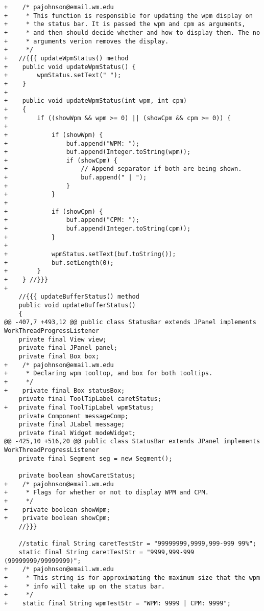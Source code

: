 \documentclass[12pt]{article}
\begin{document}
\begin{verbatim}
+    /* pajohnson@email.wm.edu
+     * This function is responsible for updating the wpm display on
+     * the status bar. It is passed the wpm and cpm as arguments,
+     * and then should decide whether and how to display them. The no
+     * arguments verion removes the display.
+     */
+	//{{{ updateWpmStatus() method
+    public void updateWpmStatus() {
+        wpmStatus.setText(" ");
+    }
+
+    public void updateWpmStatus(int wpm, int cpm)
+    {
+        if ((showWpm && wpm >= 0) || (showCpm && cpm >= 0)) {
+
+            if (showWpm) {
+                buf.append("WPM: ");
+                buf.append(Integer.toString(wpm));
+                if (showCpm) {
+                    // Append separator if both are being shown.
+                    buf.append(" | ");
+                }
+            }
+
+            if (showCpm) {
+                buf.append("CPM: ");
+                buf.append(Integer.toString(cpm));
+            }
+
+            wpmStatus.setText(buf.toString());
+            buf.setLength(0);
+        }
+    } //}}}
+
 	//{{{ updateBufferStatus() method
 	public void updateBufferStatus()
 	{
@@ -407,7 +493,12 @@ public class StatusBar extends JPanel implements WorkThreadProgressListener
 	private final View view;
 	private final JPanel panel;
 	private final Box box;
+    /* pajohnson@email.wm.edu
+     * Declaring wpm tooltop, and box for both tooltips.
+     */
+    private final Box statusBox;
 	private final ToolTipLabel caretStatus;
+	private final ToolTipLabel wpmStatus;
 	private Component messageComp;
 	private final JLabel message;
 	private final Widget modeWidget;
@@ -425,10 +516,20 @@ public class StatusBar extends JPanel implements WorkThreadProgressListener
 	private final Segment seg = new Segment();
 
 	private boolean showCaretStatus;
+    /* pajohnson@email.wm.edu
+     * Flags for whether or not to display WPM and CPM.
+     */
+    private boolean showWpm;
+    private boolean showCpm;
 	//}}}
 
 	//static final String caretTestStr = "99999999,9999,999-999 99%";
 	static final String caretTestStr = "9999,999-999 (99999999/99999999)";
+    /* pajohnson@email.wm.edu
+     * This string is for approximating the maximum size that the wpm
+     * info will take up on the status bar.
+     */
+    static final String wpmTestStr = "WPM: 9999 | CPM: 9999";
 

\end{verbatim}
\end{document}
